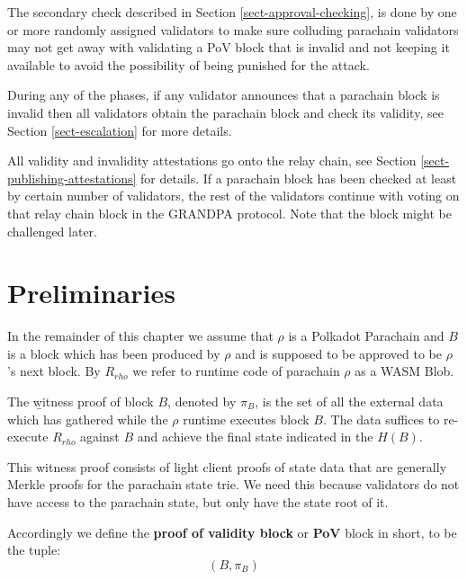 The secondary check described in Section \ref{sect-approval-checking}, is done by one or more randomly assigned validators to make sure colluding parachain validators may not get away with validating a PoV block that is invalid and not keeping it available to avoid the possibility of being punished for the attack.

During any of the phases, if any validator announces that a parachain block is invalid then all validators obtain the parachain block and check its validity, see Section \ref{sect-escalation} for more details. 

All validity and invalidity attestations go onto the relay chain, see Section \ref{sect-publishing-attestations} for details. If a parachain block has been checked at least by certain number of validators, the rest of the validators continue with voting on that relay chain block in the GRANDPA protocol. Note that the block might be challenged later. 
	 
\section{Preliminaries}

\begin{definition}
In the remainder of this chapter we assume that $\rho$ is a Polkadot Parachain and $B$ is a block which has been produced by $\rho$ and is supposed to be approved to be $\rho$'s next block. By $R_{rho}$ we refer to runtime code of parachain $\rho$  as a WASM Blob. 
\end{definition}

\begin{definition}
  \label{defn-witness-proof}
  The {\b witness proof} of block $B$, denoted by {\bf $\pi_B$}, is the set of all the external data which has gathered while the $\rho$ runtime executes block $B$. The data suffices to re-execute $R_{rho}$ against $B$ and achieve the final state indicated in the $H(B)$.
\end{definition}
 
This witness proof consists of light client proofs of state data that are generally Merkle proofs for the parachain state trie.  We need this because validators do not have access to the parachain state, but only have the state root of it. 
 
\begin{definition}
  \label{defn-pov-block}
  Accordingly we define the {\bf proof of validity block} or {\bf PoV} block in short, %
  to be the tuple:
  \[
  (B, \pi_B)
  \]
\end{definition}

